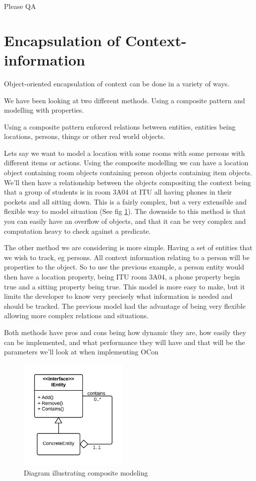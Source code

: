 \documentclass[../report.tex]{subfiles}
\begin{document}
\todo Please QA

\section{Encapsulation of Context-information}
Object-oriented encapsulation of context can be done in a variety of ways.

We have been looking at two different methods. Using a composite pattern and modelling with properties.

Using a composite pattern enforced relations between entities, entities being locations, persons, things or other real world objects.

Lets say we want to model a location with some rooms with some persons with different items or actions. Using the composite modelling we can have a location object containing room objects containing person objects containing item objects. We'll then have a relationship between the objects compositing the context being that a group of students is in room 3A04 at ITU all having phones in their pockets and all sitting down. This is a fairly complex, but a very extensible and flexible way to model situation (See fig \ref{fig:composite}). The downside to this method is that you can easily have an overflow of objects, and that it can be very complex and computation heavy to check against a predicate.

The other method we are considering is more simple. Having a set of entities that we wish to track, eg persons. All context information relating to a person will be properties to the object. So to use the previous example, a person entity would then have a location property, being ITU room 3A04, a phone property begin true and a sitting property being true. This model is more easy to make, but it limits the developer to know very precisely what information is needed and should be tracked. The previous model had the advantage of being very flexible allowing more complex relations and situations. 

Both methods have pros and cons being how dynamic they are, how easily they can be implemented, and what performance they will have and that will be the parameters we'll look at when implementing OCon 

\begin{figure}
\centering
\includegraphics[width=200px]{composite.png}
\caption{Diagram illustrating composite modeling}
\label{fig:composite}
\end{figure}
\end{document}
